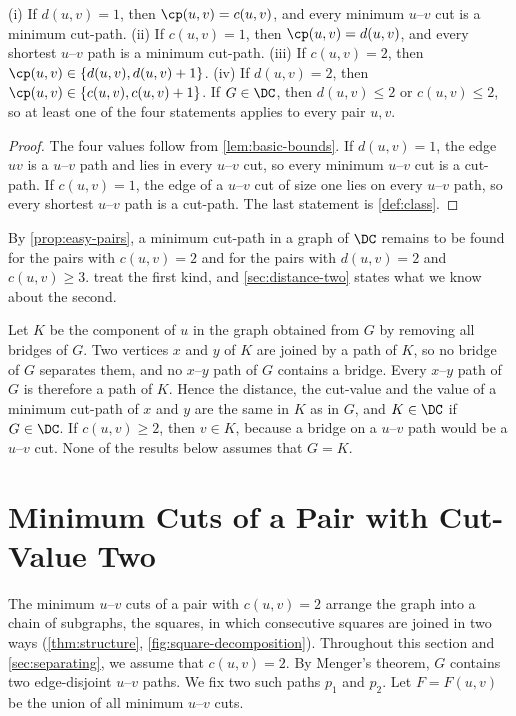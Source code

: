 \begin{proposition}
\label{prop:easy-pairs}
(i) If $d(u, v) = 1$, then $\cp(u, v) = c(u, v)$, and every minimum $u$--$v$ cut is a minimum cut-path.
(ii) If $c(u, v) = 1$, then $\cp(u, v) = d(u, v)$, and every shortest $u$--$v$ path is a minimum cut-path.
(iii) If $c(u, v) = 2$, then $\cp(u, v) \in \{d(u, v), d(u, v) + 1\}$.
(iv) If $d(u, v) = 2$, then $\cp(u, v) \in \{c(u, v), c(u, v) + 1\}$.
If $G \in \DC$, then $d(u, v) \leq 2$ or $c(u, v) \leq 2$, so at least one of the four statements applies to every pair $u, v$.
\end{proposition}

\begin{proof}
The four values follow from \cref{lem:basic-bounds}.
If $d(u, v) = 1$, the edge $uv$ is a $u$--$v$ path and lies in every $u$--$v$ cut, so every minimum $u$--$v$ cut is a cut-path.
If $c(u, v) = 1$, the edge of a $u$--$v$ cut of size one lies on every $u$--$v$ path, so every shortest $u$--$v$ path is a cut-path.
The last statement is \cref{def:class}.
\end{proof}

By \cref{prop:easy-pairs}, a minimum cut-path in a graph of $\DC$ remains to be found for the pairs with $c(u, v) = 2$ and for the pairs with $d(u, v) = 2$ and $c(u, v) \geq 3$.
 treat the first kind, and \cref{sec:distance-two} states what we know about the second.

\begin{remark}[Bridges]
\label{rem:bridges}
Let $K$ be the component of $u$ in the graph obtained from $G$ by removing all bridges of $G$.
Two vertices $x$ and $y$ of $K$ are joined by a path of $K$, so no bridge of $G$ separates them, and no $x$--$y$ path of $G$ contains a bridge.
Every $x$--$y$ path of $G$ is therefore a path of $K$.
Hence the distance, the cut-value and the value of a minimum cut-path of $x$ and $y$ are the same in $K$ as in $G$, and $K \in \DC$ if $G \in \DC$.
If $c(u, v) \geq 2$, then $v \in K$, because a bridge on a $u$--$v$ path would be a $u$--$v$ cut.
None of the results below assumes that $G = K$.
\end{remark}

\section{Minimum Cuts of a Pair with Cut-Value Two}
\label{sec:structure}

The minimum $u$--$v$ cuts of a pair with $c(u, v) = 2$ arrange the graph into a chain of subgraphs, the squares, in which consecutive squares are joined in two ways (\cref{thm:structure}, \cref{fig:square-decomposition}).
Throughout this section and \cref{sec:separating}, we assume that $c(u, v) = 2$.
By Menger's theorem, $G$ contains two edge-disjoint $u$--$v$ paths.
We fix two such paths $p_1$ and $p_2$.
Let $F = F(u, v)$ be the union of all minimum $u$--$v$ cuts.

